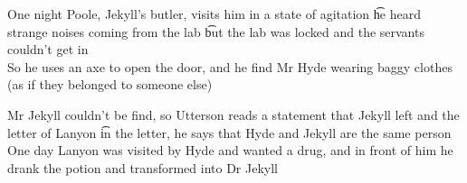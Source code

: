 \documentclass[12pt]{article}
\begin{document}
\sss[Q7]
One night Poole, Jekyll's butler, visits him in a state of agitation \t he heard strange noises coming from the lab \t but the lab was locked and the servants couldn't get in \\
So he uses an axe to open the door, and he find Mr Hyde wearing baggy clothes (as if they belonged to someone else)

\sss[Q8]
Mr Jekyll couldn't be find, so Utterson reads a statement that Jekyll left and the letter of Lanyon \t in the letter, he says that Hyde and Jekyll are the same person \\
One day Lanyon was visited by Hyde and wanted a drug, and in front of him he drank the potion and transformed into Dr Jekyll
\end{document}
